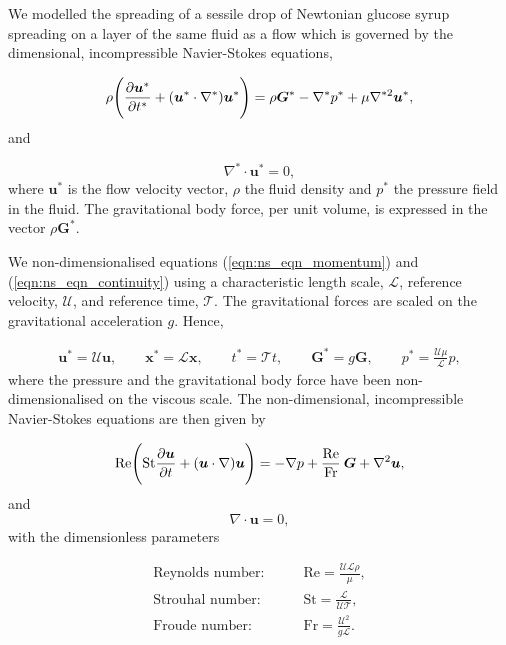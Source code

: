 \documentclass[aip,graphicx]{revtex4-1}
\newcommand{\sym}[1]{\text{#1}} \newcommand{\dif}{\mathrm{d}}
\newcommand{\vect}[1]{\bm{#1}}
\begin{document}
We modelled the spreading of a sessile drop of Newtonian glucose syrup
spreading on a layer of the same fluid as a flow which is governed by
the dimensional, incompressible Navier-Stokes equations,

\begin{equation}
 \rho \Bigg( \pder[\vect{u}^*]{t^*} + (\vect{u}^* \cdot \nabla^*)
 \vect{u}^* \Bigg) = \rho \vect{G}^* - \nabla^* p^* + \mu \nabla^{*2}
 \vect{u}^*,
 \label{eqn:ns_eqn_momentum}
\end{equation}
and

\begin{equation}
 \nabla^* \cdot \vect{u}^* = 0,
 \label{eqn:ns_eqn_continuity}
\end{equation}
where $\vect{u}^*$ is the flow velocity vector, $\rho$ the fluid
density and $p^*$ the pressure field in the fluid.  The gravitational
body force, per unit volume, is expressed in the vector $\rho
\vect{G}^*$.

We non-dimensionalised equations (\ref{eqn:ns_eqn_momentum}) and
(\ref{eqn:ns_eqn_continuity}) using a characteristic length scale,
$\mathcal{L}$, reference velocity, $\mathcal{U}$, and reference time,
$\mathcal{T}$.  The gravitational forces are scaled on the
gravitational acceleration $g$.  Hence,

\begin{gather}
 \vect{u}^*=\mathcal{U} \vect{u}, \qquad \vect{x}^*=\mathcal{L}
 \vect{x}, \qquad t^*= \mathcal{T} t, \qquad \vect{G}^*=g \vect{G},
 \qquad p^*= \frac{\mathcal{U} \mu}{\mathcal{L}} p,
 \label{eqn:ns_eqn_nondim}
\end{gather}
where the pressure and the gravitational body force have been
non-dimensionalised on the viscous scale.  The non-dimensional,
incompressible Navier-Stokes equations are then given by

\begin{equation}
 \sym{Re} \Bigg( \sym{St} \pder[\vect{u}]{t} + (\vect{u} \cdot \nabla)
 \vect{u} \Bigg) = - \nabla p + \frac{\sym{Re}}{\sym{Fr}} \: \vect{G}
 + \nabla^2 \vect{u},
 \label{eqn:ns_eqn_momentum_nondim}
\end{equation}
and
\begin{equation}
 \nabla \cdot \vect{u} = 0,
 \label{eqn:ns_eqn_continuity_nondim}
\end{equation}
with the dimensionless parameters

\begin{align*}
 \text{Reynolds number:} \qquad &\sym{Re}=\frac{\mathcal{UL}
   \rho}{\mu}, \\ \text{Strouhal number:} \qquad
 &\sym{St}=\frac{\mathcal{L}}{\mathcal{UT}}, \\ \text{Froude number:}
 \qquad &\sym{Fr}=\frac{\mathcal{U}^2}{g \mathcal{L}}.
\end{align*}
\end{document}
